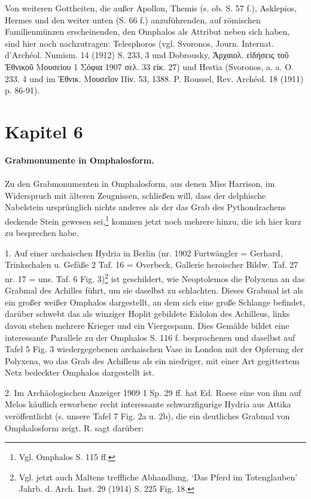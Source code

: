 \documentclass[a4paper, 11pt, oneside]{article}
\begin{document}
Von weiteren Gottheiten, die außer Apollon, Themis (s. ob. S. 57 f.), Asklepios, Hermes und den weiter unten (S. 66 f.) anzuführenden, auf römischen Familienmünzen erscheinenden, den Omphalos als Attribut neben sich haben, sind hier noch nachzutragen: Telesphoros (vgl. Svoronos, Journ. Internat. d'Archéol. Numism. 14 (1912) S. 233, 3 und Dobrousky, Ἀρχαιολ. εἰδήσεις τοῦ Ἐθνικοῦ Μουσείου 1 Σόφια 1907 σελ. 33 είκ. 27) und Hestia (Svoronos, a. a. O. 233. 4 und im Ἐθνικ. Μουσεῖον Πίν. 53, 1388. P. Roussel, Rev. Archéol. 18 (1911) p. 86-91).
\clearpage
\section{Kapitel 6}
\begin{center}
\textbf{Grabmonumente in Omphalosform.}
\end{center}
\paragraph{}
Zu den Grabmonumenten in Omphalosform, aus denen Miss Harrison, im Widerspruch mit älteren Zeugnissen, schließen will, dass der delphische Nabelstein ursprünglich nichts anderes als der das Grab des Pythondrachens deckende Stein gewesen sei,\footnote{Vgl. Omphalos S. 115 ff.} kommen jetzt noch mehrere hinzu, die ich hier kurz zu besprechen habe.

1. Auf einer archaischen Hydria in Berlin (nr. 1902 Furtwängler = Gerhard, Trinkschalen u. Gefäße 2 Taf. 16 = Overbeck, Gallerie heroischer Bildw. Taf. 27 nr. 17 = uns. Taf. 6 Fig. 3)\footnote{Vgl. jetzt auch Maltens treffliche Abhandlung, `Das Pferd im Totenglauben' Jahrb. d. Arch. Inst. 29 (1914) S. 225 Fig. 18.} ist geschildert, wie Neoptolemos die Polyxena an das Grabmal des Achilles führt, um sie daselbst zu schlachten. Dieses Grabmal ist als ein großer weißer Omphalos dargestellt, an dem sich eine große Schlange befindet, darüber schwebt das als winziger Hoplit gebildete Eidolon des Achilleus, links davon stehen mehrere Krieger und ein Viergespann. Dies Gemälde bildet eine interessante Parallele zu der Omphalos S. 116 f. besprochenen und daselbst auf Tafel 5 Fig. 3 wiedergegebenen archaischen Vase in London mit der Opferung der Polyxena, wo das Grab des Achilleus als ein niedriger, mit einer Art gegittertem Netz bedeckter Omphalos dargestellt ist.

2. Im Archäologischen Anzeiger 1909 1 Sp. 29 ff. hat Ed. Roese eine von ihm auf Melos käuflich erworbene recht interessante schwarzfigurige Hydria aus Attika veröffentlicht (s. unsere Tafel 7 Fig. 2a u. 2b), die ein deutliches Grabmal von Omphalosform zeigt. R. sagt darüber:
\end{document}

